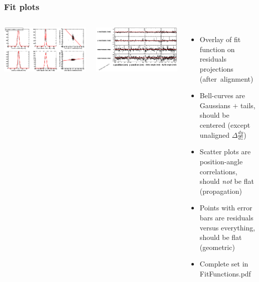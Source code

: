 \documentclass[compress]{beamer}
\begin{document}
\begin{frame}
\frametitle{Fit plots}
\begin{columns}
\includegraphics[width=\linewidth]{NOV4_fitfunctions/MBwhCst1sec10_bellcurves.png}

\includegraphics[width=\linewidth]{NOV4_fitfunctions/MBwhCst1sec10_polynomials.png}

\begin{itemize}
\item Overlay of fit function on residuals projections \mbox{(after alignment)}
\item Bell-curves are Gaussians $+$ tails, should be centered (except unaligned $\Delta \frac{dy}{dz}$)
\item Scatter plots are position-angle correlations, should {\it not} be flat (propagation)
\item Points with error bars are residuals versus everything, should be flat (geometric)
\item Complete set in FitFunctions.pdf
\end{itemize}
\end{columns}
\end{frame}
\end{document}
